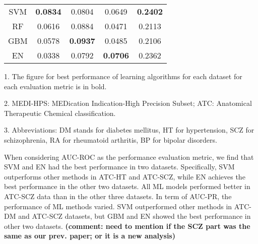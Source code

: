 \begin{table}[htbp]
\begin{threeparttable}
\begin{tabular}{ccccc}
        SVM   & \textbf{0.0834} &     0.0804      &     0.0649      & \textbf{0.2402} \\
        RF    &     0.0616      &     0.0884      &     0.0471      &     0.2113 \\
        GBM   &     0.0578      & \textbf{0.0937} &     0.0485      &     0.2106 \\
        EN    &     0.0338      &     0.0792      & \textbf{0.0706} &     0.2362 \\
        \bottomrule
        \end{tabular}%
        \begin{tablenotes}
          \item 1. The figure for best performance of learning algorithms for each dataset for each evaluation metric is in bold.
          \item 2. MEDI-HPS: MEDication Indication-High Precision Subset; ATC: Anatomical Therapeutic Chemical classification.
          \item 3. Abbreviations: DM stands for diabetes mellitus, HT for hypertension, SCZ for schizophrenia, RA for rheumatoid arthritis, BP for bipolar disorders.          
        \end{tablenotes}
      \end{threeparttable}
      \label{tab:target_ml_performance}%
    \end{table}

    When considering AUC-ROC as the performance evaluation metric, we find that SVM and EN had the best performance in two datasets. Specifically, SVM outperforms other methods in ATC-HT and ATC-SCZ, while EN achieves the best performance in the other two datasets. All ML models performed better in ATC-SCZ data than in the other three datasets. In term of AUC-PR, the performance of  ML methods varied. SVM outperformed other methods in ATC-DM and ATC-SCZ datasets, but GBM and EN showed the best performance in other two datasets.
 \textbf{   (comment: need to mention if the SCZ part was the same as our prev. paper; or it is a new analysis) }

